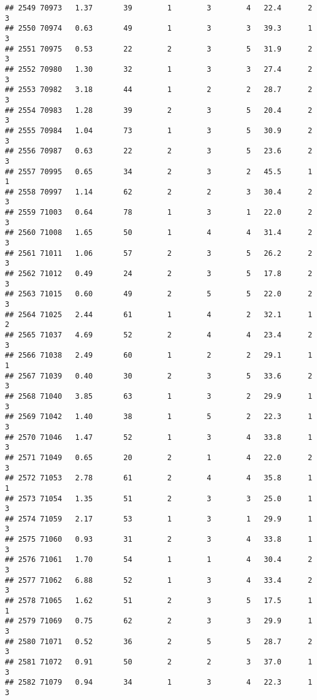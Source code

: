\documentclass[
]{article}
\begin{document}
\begin{verbatim}
## 2549 70973   1.37       39        1        3        4   22.4      2      3
## 2550 70974   0.63       49        1        3        3   39.3      1      3
## 2551 70975   0.53       22        2        3        5   31.9      2      3
## 2552 70980   1.30       32        1        3        3   27.4      2      3
## 2553 70982   3.18       44        1        2        2   28.7      2      3
## 2554 70983   1.28       39        2        3        5   20.4      2      3
## 2555 70984   1.04       73        1        3        5   30.9      2      3
## 2556 70987   0.63       22        2        3        5   23.6      2      3
## 2557 70995   0.65       34        2        3        2   45.5      1      1
## 2558 70997   1.14       62        2        2        3   30.4      2      3
## 2559 71003   0.64       78        1        3        1   22.0      2      3
## 2560 71008   1.65       50        1        4        4   31.4      2      3
## 2561 71011   1.06       57        2        3        5   26.2      2      3
## 2562 71012   0.49       24        2        3        5   17.8      2      3
## 2563 71015   0.60       49        2        5        5   22.0      2      3
## 2564 71025   2.44       61        1        4        2   32.1      1      2
## 2565 71037   4.69       52        2        4        4   23.4      2      3
## 2566 71038   2.49       60        1        2        2   29.1      1      1
## 2567 71039   0.40       30        2        3        5   33.6      2      3
## 2568 71040   3.85       63        1        3        2   29.9      1      3
## 2569 71042   1.40       38        1        5        2   22.3      1      3
## 2570 71046   1.47       52        1        3        4   33.8      1      3
## 2571 71049   0.65       20        2        1        4   22.0      2      3
## 2572 71053   2.78       61        2        4        4   35.8      1      1
## 2573 71054   1.35       51        2        3        3   25.0      1      3
## 2574 71059   2.17       53        1        3        1   29.9      1      3
## 2575 71060   0.93       31        2        3        4   33.8      1      3
## 2576 71061   1.70       54        1        1        4   30.4      2      3
## 2577 71062   6.88       52        1        3        4   33.4      2      3
## 2578 71065   1.62       51        2        3        5   17.5      1      1
## 2579 71069   0.75       62        2        3        3   29.9      1      3
## 2580 71071   0.52       36        2        5        5   28.7      2      3
## 2581 71072   0.91       50        2        2        3   37.0      1      3
## 2582 71079   0.94       34        1        3        4   22.3      1      3

\end{verbatim}
\end{document}
